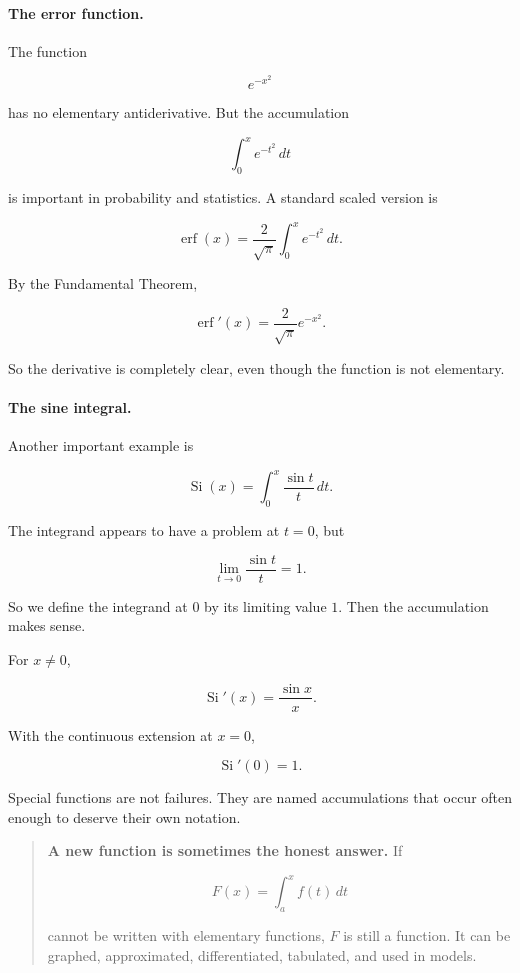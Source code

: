 \paragraph{The error function.}
The function

\[
e^{-x^2}
\]

has no elementary antiderivative.  But the accumulation

\[
\int_0^x e^{-t^2}\,dt
\]

is important in probability and statistics.  A standard scaled version is

\[
\boxed{
\operatorname{erf}(x)=\frac{2}{\sqrt{\pi}}\int_0^x e^{-t^2}\,dt.
}
\]

By the Fundamental Theorem,

\[
\operatorname{erf}'(x)
=
\frac{2}{\sqrt{\pi}}e^{-x^2}.
\]

So the derivative is completely clear, even though the function is not elementary.

\paragraph{The sine integral.}
Another important example is

\[
\boxed{
\operatorname{Si}(x)=\int_0^x \frac{\sin t}{t}\,dt.
}
\]

The integrand appears to have a problem at \(t=0\), but

\[
\lim_{t\to0}\frac{\sin t}{t}=1.
\]

So we define the integrand at \(0\) by its limiting value \(1\).  Then the accumulation
makes sense.

For \(x\neq0\),

\[
\operatorname{Si}'(x)=\frac{\sin x}{x}.
\]

With the continuous extension at \(x=0\),

\[
\operatorname{Si}'(0)=1.
\]

Special functions are not failures.  They are named accumulations that occur often
enough to deserve their own notation.

\begin{quote}
\textbf{A new function is sometimes the honest answer.}
If

\[
F(x)=\int_a^x f(t)\,dt
\]

cannot be written with elementary functions, \(F\) is still a function.  It can be
graphed, approximated, differentiated, tabulated, and used in models.
\end{quote}

